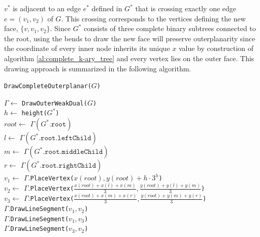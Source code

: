 $v^*$ is adjacent to an edge $e^*$ defined in $G^*$ that is crossing exactly one edge $e = (v_1,v_2)$ of $G$. This crossing corresponds to the vertices defining the new face, $\{v, v_1, v_2\}$. Since $G^*$ consists of three complete binary subtrees connected to the root, using the bends to draw the new face will preserve outerplanarity since the coordinate of every inner node inherits its unique $x$ value by construction of algorithm \ref{al:complete_k-ary_tree} and every vertex lies on the outer face.
This drawing approach is summarized in the following algorithm.\\
\begin{algorithm}[H]
	\caption{\texttt{DrawCompleteOuterplanar($G$)}}\label{al:complete_outerplanar}\label{algo:complete_outerplanar_graph_dual}
	$\Gamma \gets $ \texttt{DrawOuterWeakDual($G$)}\\
	$h \gets$ \texttt{height($G^*$)}\\
	$root \gets$ $\Gamma(G^*.\texttt{root})$\\
	$l \gets$ $\Gamma(G^*.\texttt{root.leftChild})$\\
	$m \gets$ $\Gamma(G^*.\texttt{root.middleChild})$\\
	$r \gets$ $\Gamma(G^*.\texttt{root.rightChild})$\\
	$v_1 \gets$ $\Gamma$.\texttt{PlaceVertex($x(root),y(root)+h\cdot 3^h$)}\\
	$v_2 \gets$ $\Gamma$.\texttt{PlaceVertex($\frac{x(root)+x(l)+x(m)}{3},\frac{y(root)+y(l)+y(m)}{3}$)}\\
	$v_3 \gets$ $\Gamma$.\texttt{PlaceVertex($\frac{x(root)+x(m)+x(r)}{3},\frac{y(root)+y(m)+y(r )}{3}$)}\\
	$\Gamma$.\texttt{DrawLineSegment($v_1,v_2$)}\\
	$\Gamma$.\texttt{DrawLineSegment($v_1,v_3$)}\\
	$\Gamma$.\texttt{DrawLineSegment($v_3,v_2$)}\\
	

\end{algorithm}
